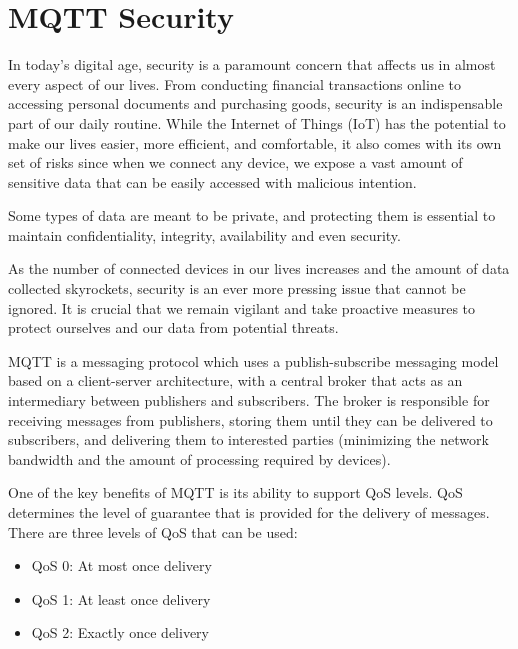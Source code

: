 \section{\acs{MQTT} Security}
\label{sec:report}

In today's digital age, security is a paramount concern that affects us in almost every aspect of our lives. 
From conducting financial transactions online to accessing personal documents and purchasing goods, security is an indispensable part of our daily routine. 
While the Internet of Things (IoT) has the potential to make our lives easier, more efficient, and comfortable, it also comes with its own set of risks since when we connect any device, we expose a vast amount of sensitive data that can be easily accessed with malicious intention.

Some types of data are meant to be private, and protecting them is essential to maintain confidentiality, integrity, availability and even security. 

As the number of connected devices in our lives increases and the amount of data collected skyrockets, security is an ever more pressing issue that cannot be ignored. 
It is crucial that we remain vigilant and take proactive measures to protect ourselves and our data from potential threats.

\ac{MQTT} is a messaging protocol which uses a publish-subscribe messaging model based on a client-server architecture, with a central broker that acts as an intermediary between publishers and subscribers.
The broker is responsible for receiving messages from publishers, storing them until they can be delivered to subscribers, and delivering them to interested parties (minimizing the network bandwidth and the amount of processing required by devices).

One of the key benefits of \acs{MQTT} is its ability to support \ac{QoS} levels. QoS determines the level of guarantee that is provided for the delivery of messages. 
There are three levels of QoS that can be used:

\begin{itemize}
    \item \acs{QoS} 0: At most once delivery
    \item \acs{QoS} 1: At least once delivery
    \item \acs{QoS} 2: Exactly once delivery
\end{itemize}

